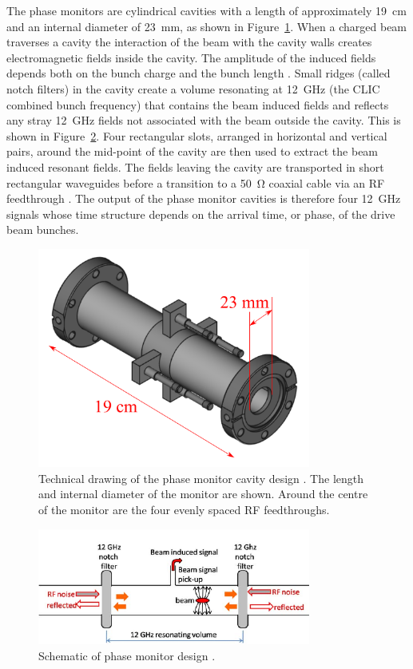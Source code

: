 The phase monitors are cylindrical cavities with a length of approximately 19~cm and an internal diameter of 23~mm, as shown in Figure~\ref{f:phMonTechDraw}. When a charged beam traverses a cavity the interaction of the beam with the cavity walls creates electromagnetic fields inside the cavity. The amplitude of the induced fields depends both on the bunch charge and the bunch length \cite{alexPFFWP}. Small ridges (called notch filters) in the cavity create a volume resonating at 12~GHz (the CLIC combined bunch frequency) that contains the beam induced fields and reflects any stray 12~GHz fields not associated with the beam outside the cavity. This is shown in Figure~\ref{f:notchFilters}. Four rectangular slots, arranged in horizontal and vertical pairs, around the mid-point of the cavity are then used to extract the beam induced resonant fields. The fields leaving the cavity are transported in short rectangular waveguides before a transition to a 50~\(\mathrm{\Omega}\) coaxial cable via an RF feedthrough \cite{phMonIPAC10}. The output of the phase monitor cavities is therefore four 12~GHz signals whose time structure depends on the arrival time, or phase, of the drive beam bunches.

\begin{figure}
  \centering
  \includegraphics[width=0.8\textwidth]{Figures/phaseMons/phMonTechDraw}
  \caption{Technical drawing of the phase monitor cavity design \cite{phMonTechDraw}. The length and internal diameter of the monitor are shown. Around the centre of the monitor are the four evenly spaced RF feedthroughs.}
  \label{f:phMonTechDraw}
\end{figure}

\begin{figure}
  \centering
  \includegraphics[width=0.8\textwidth]{Figures/phaseMons/notchFilters}
  \caption{Schematic of phase monitor design \cite{phMonEuCard}.}
  \label{f:notchFilters}
\end{figure}


